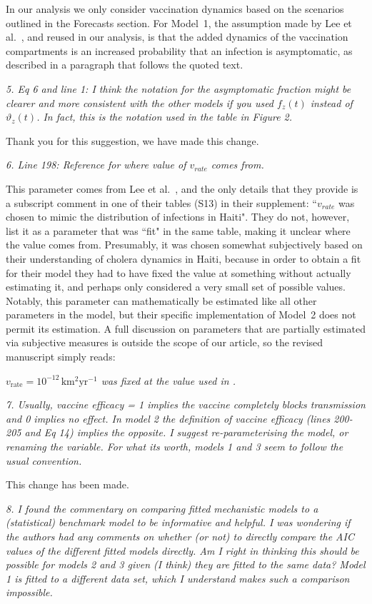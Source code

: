 \documentclass[11pt]{article}
\newcommand\report[1]{{\color{mygreen} \vspace{1mm}\hspace{0.25in}\parbox{6in}{\em #1}}}
\newcommand\article[1]{{\color{blue} \vspace{1mm}\hspace{0.25in}\parbox{6in}{\em #1}}}
\begin{document}
In our analysis we only consider vaccination dynamics based on the scenarios outlined in the Forecasts section. For Model~1, the assumption made by Lee et al.~\cite{lee20}, and reused in our analysis, is that the added dynamics of the vaccination compartments is an increased probability that an infection is asymptomatic, as described in a paragraph that follows the quoted text.

\report{5.
  Eq 6 and line 1: I think the notation for the asymptomatic fraction might be clearer and more consistent with the other models if you used $f_z(t)$ instead of $\vartheta_z(t)$. In fact, this is the notation used in the table in Figure 2.
}

Thank you for this suggestion, we have made this change.

\report{6.
  Line 198: Reference for where value of $v_{rate}$ comes from.
}

This parameter comes from Lee et al.~\cite{lee20}, and the only details that they provide is a subscript comment in one of their tables (S13) in their supplement: ``$v_{rate}$ was chosen to mimic the distribution of infections in Haiti".
They do not, however, list it as a parameter that was ``fit" in the same table, making it unclear where the value comes from.
Presumably, it was chosen somewhat subjectively based on their understanding of cholera dynamics in Haiti, because in order to obtain a fit for their model they had to have fixed the value at something without actually estimating it, and perhaps only considered a very small set of possible values. Notably, this parameter can mathematically be estimated like all other parameters in the model, but their specific implementation of Model~2 does not permit its estimation.
A full discussion on parameters that are partially estimated via subjective measures is outside the scope of our article, so the revised manuscript simply reads:

\article{$v_{\mathrm{rate}}= 10^{-12} \,\mbox{km$^2$yr$^{-1}$}$ was fixed at the value used in \cite{lee20}.}

\report{7.
  Usually, vaccine efficacy = 1 implies the vaccine completely blocks transmission and 0 implies no effect. In model 2 the definition of vaccine efficacy (lines 200-205 and Eq 14) implies the opposite. I suggest re-parameterising the model, or renaming the variable. For what its worth, models 1 and 3 seem to follow the usual convention.
}

This change has been made.

\report{8.
  I found the commentary on comparing fitted mechanistic models to a (statistical) benchmark model to be informative and helpful. I was wondering if the authors had any comments on whether (or not) to directly compare the AIC values of the different fitted models directly. Am I right in thinking this should be possible for models 2 and 3 given (I think) they are fitted to the same data? Model 1 is fitted to a different data set, which I understand makes such a comparison impossible.
}
\end{document}
